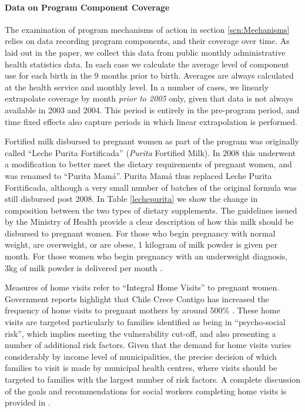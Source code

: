 \documentclass[12pt]{article}
\begin{document}
\begin{spacing}{1.4}
\begin{landscape}
\begin{table}[htpb!]
\begin{tabular}{p{4.5cm}p{5cm}p{10cm}p{2.5cm}}
  \end{tabular}
\end{table}
\end{landscape}

\paragraph{Data on Program Component Coverage}
The examination of program mechanisms of action in section
\ref{scn:Mechanisms} relies on data recording program components,
and their coverage over time.  As laid out in the paper, we
collect this data from public monthly administrative health
statistics data.  In each case we calculate the average
level of component use for each birth in the 9 months prior to
birth.  Averages are always calculated at the health service
and monthly level.  In a number of cases, we linearly
extrapolate coverage by month \emph{prior to 2005} only, 
given that data is not always available in 2003 and 2004.  This
period is entirely in the pre-program period, and time fixed
effects also capture periods in which linear extrapolation
is performed.

Fortified milk disbursed to pregnant women as part of the program
was originally called ``Leche Purita Fortificada'' (\emph{Purita}
Fortified Milk).  In 2008 this underwent a modification to better
meet the dietary requirements of pregnant women, and was renamed to
``Purita Mam\'a''.  Purita Mam\'a thus replaced Leche Purita
Foritificada, although a very small number of batches of the original
formula was still disbursed post 2008.  In Table \ref{lechepurita}
we show the change in composition between the two types of dietary
supplements.  The guidelines issued by the Ministry of Health
provide a clear description of how this milk should be disbursed
to pregnant women.  For those who begin pregnancy with normal weight,
are overweight, or are obese, 1 kilogram of milk powder is given
per month.  For those women who begin pregnancy with an underweight
diagnosis, 3kg of milk powder is delivered per month \citep{GobChile2008}.

Measures of home visits refer to ``Integral Home Visits'' to
pregnant women.  Government reports highlight that Chile Crece
Contigo has increased the frequency of home visits to pregnant mothers
by around 500\% .  These home visits are targeted particularly
to families identified as being in ``psycho-social risk'', which implies
meeting the vulnerability cut-off, and also presenting a number
of additional risk factors.  Given that the demand for home visits
varies considerably by income level of municipalities, the precise
decision of which families to visit is made by municipal health
centres, where visits should be targeted to families with the largest
number of risk factors.  A complete discussion of the goals and
recommendations for social workers completing home visits is provided
in \citet{GobChile2009}.


\end{spacing}
\end{document}
